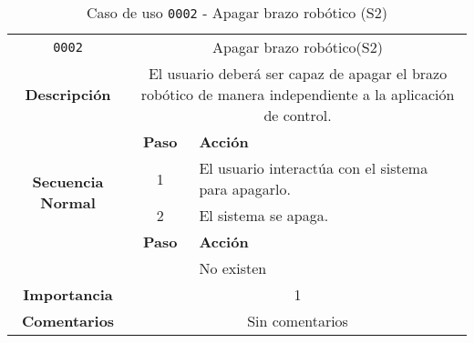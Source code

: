\begin{table}[H]
    \centering
    \begin{tabularx}{\textwidth}{|c|c|X|}
        \cline{1-3}
        \texttt{0002}                              & \multicolumn{2}{c|}{Apagar brazo robótico(\ac{S2})}                    \\ \cline{1-3}
        \textbf{Descripción}                       & \multicolumn{2}{m{13cm}|}{El usuario deberá ser capaz de apagar el brazo robótico de manera independiente a la aplicación de control.}
        \\ \cline{1-3}
        \multirow{4}{*}{\textbf{Secuencia Normal}} & \textbf{Paso}  & \textbf{Acción}
        \\ \cline{2-3}                             &   1            & El usuario interactúa con el sistema para apagarlo.
        \\ \cline{2-3}                             &   2            & El sistema se apaga.
        \\ \cline{1-3}
        \multirow{2}{*}{\textbf{Excepciones}}      & \textbf{Paso}                                                                                                                                        & \textbf{Acción}
        \\ \cline{2-3}                    &     & No existen
        \\ \cline{1-3}
        \textbf{Importancia}                       & \multicolumn{2}{c|}{1}                                                                                                                                                 \\ \cline{1-3}
        \textbf{Comentarios}                       & \multicolumn{2}{c|}{Sin comentarios}                                                                                                                                   \\ \cline{1-3}
    \end{tabularx}
    \caption{Caso de uso \texttt{0002} - Apagar brazo robótico (\ac{S2})}
    \label{tab:CU0002}
    \label{tab:caso_de_uso_apagar_brazo_robotico}
\end{table}

